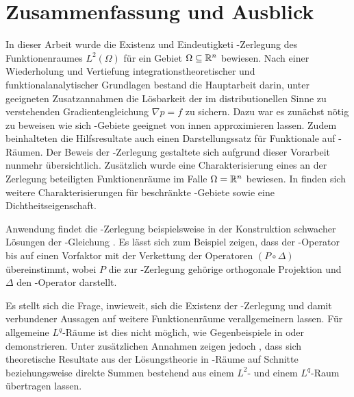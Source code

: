 \chapter{Zusammenfassung und Ausblick}

In dieser Arbeit wurde die Existenz und Eindeutigketi \helmholtz\hyp{}Zerlegung des Funktionenraumes $L^2(\Omega)$ für ein Gebiet $\Omega \subseteq \mathbb{R}^n$ bewiesen.
Nach einer Wiederholung und Vertiefung integrationstheoretischer und funktionalanalytischer Grundlagen bestand die Hauptarbeit darin, unter geeigneten Zusatzannahmen die Lösbarkeit der im distributionellen Sinne zu verstehenden Gradientengleichung $\nabla p = f$ zu sichern.
Dazu war es zunächst nötig zu beweisen wie sich \lipschitz\hyp{}Gebiete geeignet von innen approximieren lassen.
Zudem beinhalteten die Hilfsresultate auch einen Darstellungssatz für Funktionale auf \sobolev\hyp{}Räumen.
Der Beweis der \helmholtz\hyp{}Zerlegung gestaltete sich aufgrund dieser Vorarbeit nunmehr übersichtlich.
Zusätzlich wurde eine Charakterisierung eines an der Zerlegung beteiligten Funktionenräume im Falle $\Omega = \mathbb{R}^n$ bewiesen.
In \cite[S.81ff., II.2.5]{sohr2001navier} finden sich weitere Charakterisierungen für beschränkte \lipschitz\hyp{}Gebiete sowie eine Dichtheitseigenschaft.

Anwendung findet die \helmholtz\hyp{}Zerlegung beispielsweise in der Konstruktion schwacher Lösungen der \stokes\hyp{}Gleichung \cite[S.129f.]{sohr2001navier}. 
Es lässt sich zum Beispiel zeigen, dass der \stokes\hyp{}Operator bis auf einen Vorfaktor mit der Verkettung der Operatoren $(P \circ \Delta)$ übereinstimmt, wobei $P$ die zur \helmholtz\hyp{}Zerlegung gehörige orthogonale Projektion und $\Delta$ den \laplace\hyp{}Operator darstellt.

Es stellt sich die Frage, inwieweit, sich die Existenz der \helmholtz\hyp{}Zerlegung und damit verbundener Aussagen auf weitere Funktionenräume verallgemeinern lassen.
Für allgemeine $L^q$\hyp{}Räume ist dies nicht möglich, wie Gegenbeispiele in \cite{maslennikova1986elliptic} oder \cite{bogovski1986decomposition} demonstrieren.
Unter zusätzlichen Annahmen zeigen jedoch \cite{farwig05thehelmholtz,farwig05anLq}, dass sich theoretische Resultate aus der Lösungstheorie in \hilbert\hyp{}Räume auf Schnitte beziehungsweise direkte Summen bestehend aus einem $L^2$- und einem $L^q$\hyp{}Raum übertragen lassen.

